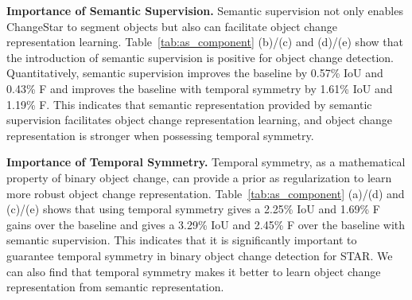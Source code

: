 \documentclass[10pt,twocolumn,letterpaper]{article}
\begin{document}
\begin{table}[htb]
    \caption{Object change detection results on LEVIR-CD for understanding the contribution of each component.
        \label{tab:as_component}}
    \centering
    \renewcommand{\arraystretch}{1.5}
    \vspace{-4mm}
\end{table}



\noindent\textbf{Importance of Semantic Supervision.}
Semantic supervision not only enables ChangeStar to segment objects but also can facilitate object change representation learning.
Table~\ref{tab:as_component} (b)/(c) and (d)/(e) show that the introduction of semantic supervision is positive for object change detection.
Quantitatively, semantic supervision improves the baseline by 0.57\% IoU and 0.43\% F and improves the baseline with temporal symmetry by 1.61\% IoU and 1.19\% F.
This indicates that semantic representation provided by semantic supervision facilitates object change representation learning, and object change representation is stronger when possessing temporal symmetry.

\noindent\textbf{Importance of Temporal Symmetry.}
Temporal symmetry, as a mathematical property of binary object change, can provide a prior as regularization to learn more robust object change representation.
Table~\ref{tab:as_component} (a)/(d) and (c)/(e) shows that using temporal symmetry gives a 2.25\% IoU and 1.69\% F gains over the baseline and gives a 3.29\% IoU and 2.45\% F over the baseline with semantic supervision.
This indicates that it is significantly important to guarantee temporal symmetry in binary object change detection for STAR.
We can also find that temporal symmetry makes it better to learn object change representation from semantic representation.
\end{document}
